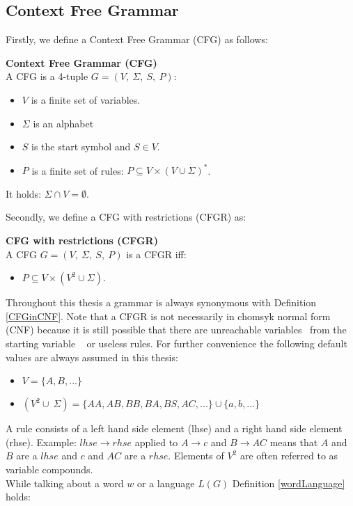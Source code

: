 \subsection{Context Free Grammar} \label{cfgChapter}
Firstly, we define a Context Free Grammar (CFG) as follows:
\begin{DefGrey} \textbf{Context Free Grammar (CFG)}\\
	A CFG is a 4-tuple $G=(V,\ \Sigma,\ S,\ P)$:
	\begin{itemize}
		\item $V$ is a finite set of variables.
		\item $\Sigma$ is an alphabet
		\item $S$ is the start symbol and $S \in V$.
		\item $P$ is a finite set of rules: $P \subseteq V \times (V \cup \Sigma)^{*}$.
	\end{itemize}
	It holds: $\Sigma \cap V =  \emptyset$.
\end{DefGrey}
\noindent Secondly, we define a CFG with restrictions (CFGR) as:
\begin{DefGrey}\label{CFGinCNF} \textbf{CFG with restrictions (CFGR)}\\
	A CFG $G=(V,\ \Sigma,\ S,\ P)$ is a CFGR iff:
	\begin{itemize}
		\item $P \subseteq V \times (V^2 \cup \Sigma)$.
	\end{itemize}
\end{DefGrey}
\noindent Throughout this thesis a grammar is always synonymous with Definition \ref{CFGinCNF}. Note that a CFGR is not necessarily in chomsyk normal form (CNF) because it is still possible that there are unreachable variables \textendash~from the starting variable \textendash~ or useless rules. For further convenience the following default values are always assumed in this thesis:
\begin{itemize}
	\item $V = \{A, B, ...\}$
	\item $(V^2 \cup\ \Sigma)=\{AA, AB, BB, BA, BS, AC, ... \} \cup \{a, b, ...\}$
\end{itemize}
A rule consists of a left hand side element (lhse) and a right hand side element (rhse). Example: $lhse \longrightarrow rhse$ applied to $A \longrightarrow c$ and $B \longrightarrow AC$ means that $A$ and $B$ are a $lhse$ and $c$ and $AC$ are a $rhse$. Elements of $V^2$ are often referred to as variable compounds.\\
While talking about a word $w$ or a language $L(G)$ Definition \ref{wordLanguage} holds:
